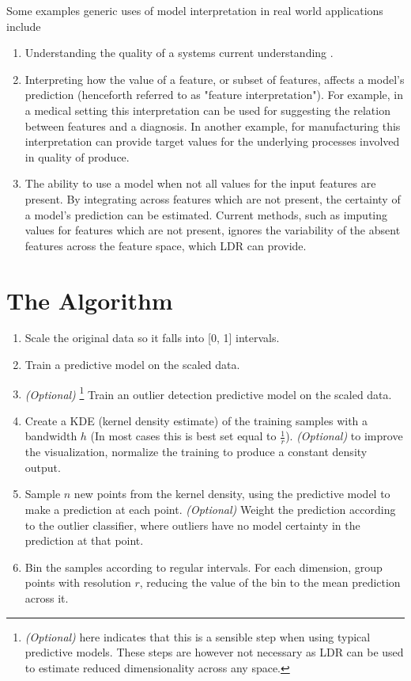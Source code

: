 \documentclass[a4paper, oneside, twocolumn]{article}
\begin{document}
Some examples generic uses of model interpretation in real world applications include

\begin{enumerate}
\item Understanding the quality of a systems current understanding \cite{amershi2011effective}. 

\item Interpreting how the value of a feature, or subset of features, affects a model's prediction (henceforth referred to as "feature interpretation"). For example, in a medical setting this interpretation can be used for suggesting the relation between features and a diagnosis. In another example, for manufacturing this interpretation can provide target values for the underlying processes involved in quality of produce.

\item The ability to use a model when not all values for the input features are present. By integrating across features which are not present, the certainty of a model's prediction can be estimated. Current methods, such as imputing values for features which are not present, ignores the variability of the absent features across the feature space, which LDR can provide.
\end{enumerate}

\section{The Algorithm}

\begin{enumerate}
\item Scale the original data so it falls into [0, 1] intervals.
\item Train a predictive model on the scaled data.
\item \textit{(Optional)} \footnote{\textit{(Optional)} here indicates that this is a sensible step when using typical predictive models. These steps are however not necessary as LDR can be used to estimate reduced dimensionality across any space.} Train an outlier detection predictive model on the scaled data.
\item Create a KDE (kernel density estimate) \cite{parzen1962estimation} of the training samples with a bandwidth $h$ (In most cases this is best set equal to $\frac{1}{r}$). \textit{(Optional)} to improve the visualization, normalize the training to produce a constant density output.
\item Sample $n$ new points from the kernel density, using the predictive model to make a prediction at each point. \textit{(Optional)} Weight the prediction according to the outlier classifier, where outliers have no model certainty in the prediction at that point.
\item Bin the samples according to regular intervals. For each dimension, group points with resolution $r$, reducing the value of the bin to the mean prediction across it.
\end{enumerate}
\end{document}
